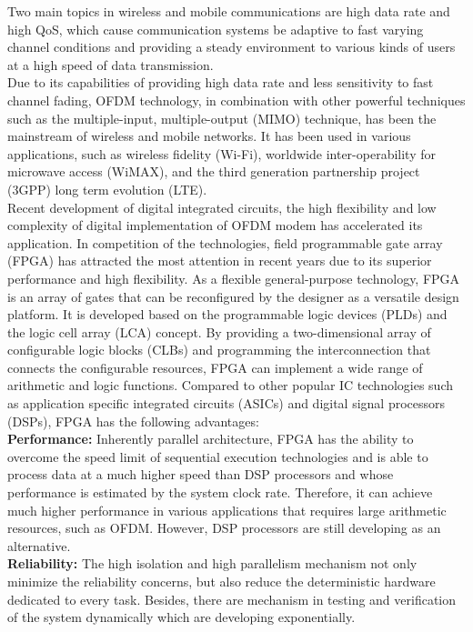 Two main topics in wireless and mobile communications are high data rate and high QoS, which cause communication systems be adaptive to fast varying channel conditions and providing a steady environment to various kinds of users at a high speed of data transmission.\\

Due to its capabilities of providing high data rate and less sensitivity to fast channel fading, OFDM technology, in combination with other powerful techniques such as the multiple-input, multiple-output (MIMO) technique, has been the mainstream of wireless and mobile networks. It has been used in various applications, such as wireless fidelity (Wi-Fi), worldwide inter-operability for microwave access (WiMAX), and the third generation partnership project (3GPP) long term evolution (LTE).\\

Recent development of digital integrated circuits, the high flexibility and low complexity of digital implementation of OFDM modem has accelerated its application. In competition of the technologies, field programmable gate array (FPGA) has attracted the most attention in recent years due to its superior performance and high flexibility. As a flexible general-purpose technology, FPGA is an array of gates that can be reconfigured by the designer as a versatile design platform. It is developed based on the programmable logic devices (PLDs) and the logic cell array (LCA) concept. By providing a two-dimensional array of configurable logic blocks (CLBs) and programming the interconnection that connects the configurable resources, FPGA can implement a wide range of arithmetic and logic functions. Compared to other popular IC technologies such as application specific integrated circuits (ASICs) and digital signal processors (DSPs), FPGA has the following advantages:\\

\textbf{Performance:} Inherently parallel architecture, FPGA has the ability to overcome the speed limit of sequential execution technologies and is able to process data at a much higher speed than DSP processors and whose performance is estimated by the system clock rate. Therefore, it can achieve much higher performance in various applications that requires large arithmetic resources, such as OFDM. However, DSP processors are still developing as an alternative.\\

\textbf{Reliability:} The high isolation and high parallelism mechanism not only minimize the reliability concerns, but also reduce the deterministic hardware dedicated to every task. Besides, there are mechanism in testing and verification of the system dynamically which are developing exponentially.\\

